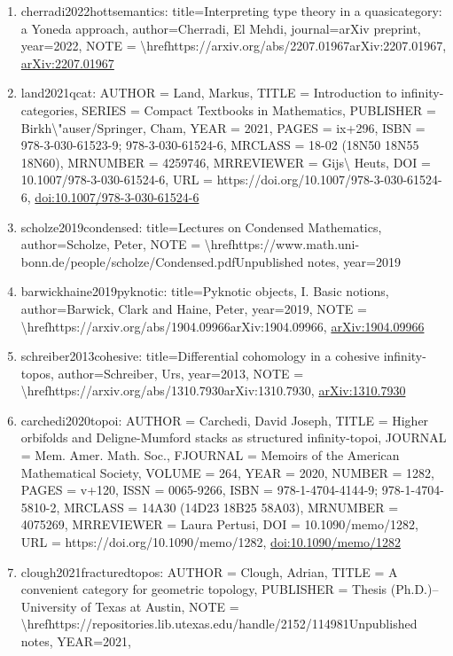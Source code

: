 \documentclass[11pt]{article}
\begin{document}
\begin{enumerate}[leftmargin=*]
  \item cherradi2022hottsemantics: title=Interpreting type theory in a quasicategory: a Yoneda approach, author=Cherradi, El Mehdi, journal=arXiv preprint, year=2022, NOTE = \textbackslash{}hrefhttps://arxiv.org/abs/2207.01967arXiv:2207.01967, \href{https://arxiv.org/abs/2207.01967}{arXiv:2207.01967}
  \item land2021qcat: AUTHOR = Land, Markus, TITLE = Introduction to infinity-categories, SERIES = Compact Textbooks in Mathematics, PUBLISHER = Birkh\textbackslash{}"auser/Springer, Cham, YEAR = 2021, PAGES = ix+296, ISBN = 978-3-030-61523-9; 978-3-030-61524-6, MRCLASS = 18-02 (18N50 18N55 18N60), MRNUMBER = 4259746, MRREVIEWER = Gijs\textbackslash{} Heuts, DOI = 10.1007/978-3-030-61524-6, URL = https://doi.org/10.1007/978-3-030-61524-6, \href{https://doi.org/10.1007/978-3-030-61524-6}{doi:10.1007/978-3-030-61524-6}
  \item scholze2019condensed: title=Lectures on Condensed Mathematics, author=Scholze, Peter, NOTE = \textbackslash{}hrefhttps://www.math.uni-bonn.de/people/scholze/Condensed.pdfUnpublished notes, year=2019
  \item barwickhaine2019pyknotic: title=Pyknotic objects, I. Basic notions, author=Barwick, Clark and Haine, Peter, year=2019, NOTE = \textbackslash{}hrefhttps://arxiv.org/abs/1904.09966arXiv:1904.09966, \href{https://arxiv.org/abs/1904.09966}{arXiv:1904.09966}
  \item schreiber2013cohesive: title=Differential cohomology in a cohesive infinity-topos, author=Schreiber, Urs, year=2013, NOTE = \textbackslash{}hrefhttps://arxiv.org/abs/1310.7930arXiv:1310.7930, \href{https://arxiv.org/abs/1310.7930}{arXiv:1310.7930}
  \item carchedi2020topoi: AUTHOR = Carchedi, David Joseph, TITLE = Higher orbifolds and Deligne-Mumford stacks as structured infinity-topoi, JOURNAL = Mem. Amer. Math. Soc., FJOURNAL = Memoirs of the American Mathematical Society, VOLUME = 264, YEAR = 2020, NUMBER = 1282, PAGES = v+120, ISSN = 0065-9266, ISBN = 978-1-4704-4144-9; 978-1-4704-5810-2, MRCLASS = 14A30 (14D23 18B25 58A03), MRNUMBER = 4075269, MRREVIEWER = Laura Pertusi, DOI = 10.1090/memo/1282, URL = https://doi.org/10.1090/memo/1282, \href{https://doi.org/10.1090/memo/1282}{doi:10.1090/memo/1282}
  \item clough2021fracturedtopos: AUTHOR = Clough, Adrian, TITLE = A convenient category for geometric topology, PUBLISHER = Thesis (Ph.D.)--University of Texas at Austin, NOTE = \textbackslash{}hrefhttps://repositories.lib.utexas.edu/handle/2152/114981Unpublished notes, YEAR=2021,

\end{enumerate}
\end{document}
